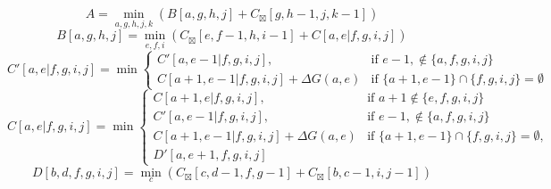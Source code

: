 \documentclass{article}
\begin{document}
$$ A =\min_{ a,g,h,j,k } \left( B\left[a,g,h,j\right]+C_{\boxtimes}\left[g,h-1,j,k-1\right]\right) $$
$$ B\left[ a,g,h,j \right] =\min_{ e,f,i } \left( C_{\boxtimes}\left[e,f-1,h,i-1\right]+C\left[a,e|f,g,i,j\right]\right) $$
$$ C' \left[a,e | f,g,i,j \right] =  \min\begin{cases}C'[ a , e-1|f,g,i,j ], &\text{if } e-1 ,\notin\{ a , f,g,i,j \} \\C[ a+1 , e-1|f,g,i,j ]+\Delta G(a,e) &\text{if } \{ a+1 , e-1 \}\cap \{ f,g,i,j \}=\emptyset\end{cases}$$
$$ C \left[a,e | f,g,i,j \right] =  \min\begin{cases}C[ a+1 , e|f,g,i,j ], &\text{if } a+1 \notin\{ e , f,g,i,j \} \\C'[ a , e-1|f,g,i,j ], &\text{if } e-1 ,\notin\{ a , f,g,i,j \} \\C[ a+1 , e-1|f,g,i,j ]+\Delta G(a,e) &\text{if } \{ a+1 , e-1 \}\cap \{ f,g,i,j \}=\emptyset,\\D'[a,e+1,f,g,i,j]\end{cases}$$
$$ D\left[ b,d,f,g,i,j \right] =\min_{ c } \left( C_{\boxtimes}\left[c,d-1,f,g-1\right]+C_{\boxtimes}\left[b,c-1,i,j-1\right]\right) $$
\end{document}
